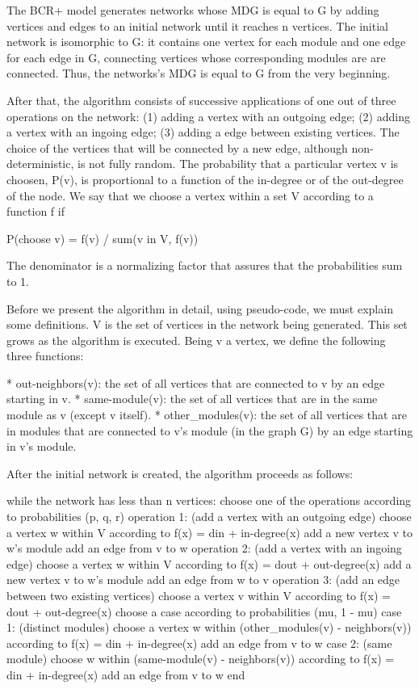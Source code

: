 The BCR+ model generates networks whose MDG is equal to G by adding vertices and
edges to an initial network until it reaches n vertices. The initial network is
isomorphic to G: it contains one vertex for each module and one edge for each
edge in G, connecting vertices whose corresponding modules are are connected.
Thus, the networks's MDG is equal to G from the very beginning.

After that, the algorithm consists of successive applications of one out of
three operations on the network: (1) adding a vertex with an outgoing edge; (2)
adding a vertex with an ingoing edge; (3) adding a edge between existing
vertices. The choice of the vertices that will be connected by a new edge,
although non-deterministic, is not fully random. The probability that a
particular vertex v is choosen, P(v), is proportional to a function of the
in-degree or of the out-degree of the node. We say that we choose a vertex
within a set V according to a function f if

  P(choose v) = f(v) / sum(v in V, f(v))

The denominator is a normalizing factor that assures that the probabilities sum
to 1.

Before we present the algorithm in detail, using pseudo-code, we must explain
some definitions. V is the set of vertices in the network being generated. This
set grows as the algorithm is executed. Being v a vertex, we define the
following three functions:

* out-neighbors(v): the set of all vertices that are connected to v by an edge
starting in v.
* same-module(v): the set of all vertices that are in the same module as v (except
v itself).
* other\_modules(v): the set of all vertices that are in modules that are connected
to v's module (in the graph G) by an edge starting in v's module.

After the initial network is created, the algorithm proceeds as follows:

while the network has less than n vertices:
  choose one of the operations according to probabilities (p, q, r)
  operation 1: (add a vertex with an outgoing edge)
    choose a vertex w within V according to f(x) = din + in-degree(x)
    add a new vertex v to w's module
    add an edge from v to w
  operation 2: (add a vertex with an ingoing edge)
    choose a vertex w within V according to f(x) = dout + out-degree(x)
    add a new vertex v to w's module
    add an edge from w to v
  operation 3: (add an edge between two existing vertices)
    choose a vertex v within V according to f(x) = dout + out-degree(x)
    choose a case according to probabilities (mu, 1 - mu)
    case 1: (distinct modules)
  	choose a vertex w within (other\_modules(v) - neighbors(v)) according to f(x) = din + in-degree(x)
      add an edge from v to w
    case 2: (same module)
      choose w within (same-module(v) - neighbors(v)) according to f(x) = din + in-degree(x)
      add an edge from v to w
  end

